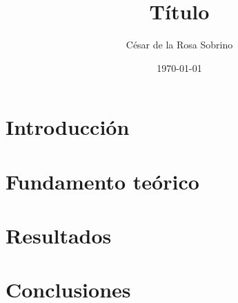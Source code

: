 \documentclass[twocolumn, aps, prd, 10pt, superscriptaddress, nofootinbib]{revtex4-2}
\date{\today}
\makeatletter
\renewcommand{\date}[1]{\gdef\@date{\textnormal{Fecha: #1}}}
\makeatother
\begin{document}
\title{Título}
\author{César de la Rosa Sobrino}
\date{\today}

\begin{abstract}
\end{abstract}

\maketitle

\section{Introducción}

\section{Fundamento teórico}

\section{Resultados}

\section{Conclusiones}



\end{document}
